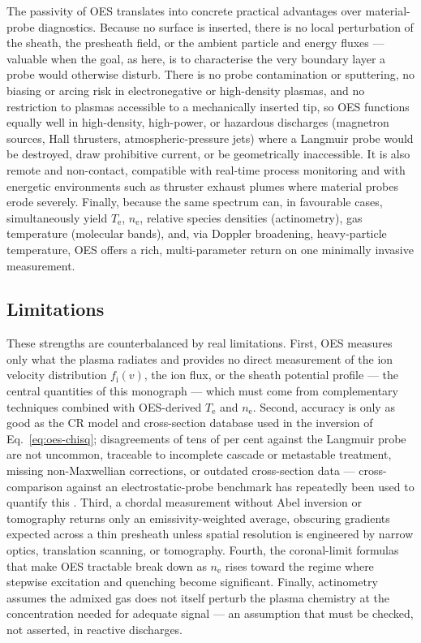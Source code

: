 The passivity of OES translates into concrete practical advantages over material-probe diagnostics. Because no surface is inserted, there is no local perturbation of the sheath, the presheath field, or the ambient particle and energy fluxes — valuable when the goal, as here, is to characterise the very boundary layer a probe would otherwise disturb. There is no probe contamination or sputtering, no biasing or arcing risk in electronegative or high-density plasmas, and no restriction to plasmas accessible to a mechanically inserted tip, so OES functions equally well in high-density, high-power, or hazardous discharges (magnetron sources, Hall thrusters, atmospheric-pressure jets) where a Langmuir probe would be destroyed, draw prohibitive current, or be geometrically inaccessible. It is also remote and non-contact, compatible with real-time process monitoring and with energetic environments such as thruster exhaust plumes \cite{ref0256,ref0257} where material probes erode severely. Finally, because the same spectrum can, in favourable cases, simultaneously yield $T_{\mathrm{e}}$, $n_{\mathrm{e}}$, relative species densities (actinometry), gas temperature (molecular bands), and, via Doppler broadening, heavy-particle temperature, OES offers a rich, multi-parameter return on one minimally invasive measurement.

\subsection{Limitations}

These strengths are counterbalanced by real limitations. First, OES measures only what the plasma radiates and provides no direct measurement of the ion velocity distribution $f_{\mathrm{i}}(v)$, the ion flux, or the sheath potential profile — the central quantities of this monograph — which must come from complementary techniques combined with OES-derived $T_{\mathrm{e}}$ and $n_{\mathrm{e}}$. Second, accuracy is only as good as the CR model and cross-section database used in the inversion of Eq.~\eqref{eq:oes-chisq}; disagreements of tens of per cent against the Langmuir probe are not uncommon, traceable to incomplete cascade or metastable treatment, missing non-Maxwellian corrections, or outdated cross-section data — cross-comparison against an electrostatic-probe benchmark has repeatedly been used to quantify this \cite{ref0266}. Third, a chordal measurement without Abel inversion or tomography returns only an emissivity-weighted average, obscuring gradients expected across a thin presheath unless spatial resolution is engineered by narrow optics, translation scanning, or tomography. Fourth, the coronal-limit formulas that make OES tractable break down as $n_{\mathrm{e}}$ rises toward the regime where stepwise excitation and quenching become significant. Finally, actinometry assumes the admixed gas does not itself perturb the plasma chemistry at the concentration needed for adequate signal — an assumption that must be checked, not asserted, in reactive discharges.

